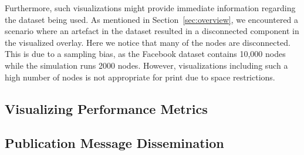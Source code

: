 Furthermore, such visualizations might provide immediate information
regarding the dataset being used. As mentioned in
Section~\ref{sec:overview}, we encountered a scenario where an artefact
in the dataset resulted in a disconnected component in the visualized
overlay. Here we notice that many of the nodes are disconnected. This is
due to a sampling bias, as the Facebook dataset contains 10,000 nodes
while the simulation runs 2000 nodes. However, visualizations including
such a high number of nodes is not appropriate for print due to space
restrictions.

\subsection{Visualizing Performance Metrics}

\subsection{Publication Message Dissemination}
\label{sec:dissviz}

